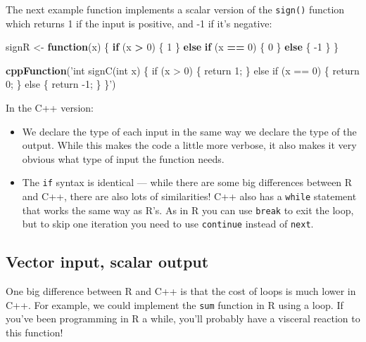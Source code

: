 \documentclass[]{book}
\newenvironment{Shaded}{\begin{snugshade}}{\end{snugshade}}
\newcommand{\ControlFlowTok}[1]{\textcolor[rgb]{0.27,0.27,0.27}{\textbf{#1}}}
\newcommand{\DecValTok}[1]{\textcolor[rgb]{0.06,0.06,0.06}{#1}}
\newcommand{\KeywordTok}[1]{\textcolor[rgb]{0.27,0.27,0.27}{\textbf{#1}}}
\newcommand{\NormalTok}[1]{#1}
\newcommand{\OperatorTok}[1]{\textcolor[rgb]{0.43,0.43,0.43}{\textbf{#1}}}
\newcommand{\StringTok}[1]{\textcolor[rgb]{0.5,0.5,0.5}{#1}}
\begin{document}
The next example function implements a scalar version of the \texttt{sign()} function which returns 1 if the input is positive, and -1 if it's negative:

\begin{Shaded}
\begin{Highlighting}[]
\NormalTok{signR <-}\StringTok{ }\ControlFlowTok{function}\NormalTok{(x) \{}
  \ControlFlowTok{if}\NormalTok{ (x }\OperatorTok{>}\StringTok{ }\DecValTok{0}\NormalTok{) \{}
    \DecValTok{1}
\NormalTok{  \} }\ControlFlowTok{else} \ControlFlowTok{if}\NormalTok{ (x }\OperatorTok{==}\StringTok{ }\DecValTok{0}\NormalTok{) \{}
    \DecValTok{0}
\NormalTok{  \} }\ControlFlowTok{else}\NormalTok{ \{}
    \DecValTok{-1}
\NormalTok{  \}}
\NormalTok{\}}

\KeywordTok{cppFunction}\NormalTok{(}\StringTok{'int signC(int x) \{}
\StringTok{  if (x > 0) \{}
\StringTok{    return 1;}
\StringTok{  \} else if (x == 0) \{}
\StringTok{    return 0;}
\StringTok{  \} else \{}
\StringTok{    return -1;}
\StringTok{  \}}
\StringTok{\}'}\NormalTok{)}
\end{Highlighting}
\end{Shaded}

In the C++ version:

\begin{itemize}
\item
  We declare the type of each input in the same way we declare the type of the
  output. While this makes the code a little more verbose, it also makes it
  very obvious what type of input the function needs.
\item
  The \texttt{if} syntax is identical --- while there are some big differences between
  R and C++, there are also lots of similarities! C++ also has a \texttt{while}
  statement that works the same way as R's. As in R you can use \texttt{break} to
  exit the loop, but to skip one iteration you need to use \texttt{continue} instead
  of \texttt{next}.
\end{itemize}

\hypertarget{vector-input-scalar-output}{%
\subsection{Vector input, scalar output}\label{vector-input-scalar-output}}

One big difference between R and C++ is that the cost of loops is much lower in C++. For example, we could implement the \texttt{sum} function in R using a loop. If you've been programming in R a while, you'll probably have a visceral reaction to this function!
\end{document}
